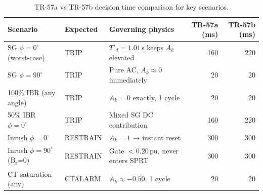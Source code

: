 \documentclass[11pt, a4paper]{article}
\newcommand{\Ak}{A_k}
\begin{document}
\begin{table}[htbp]
  \centering
  \caption{TR-57a vs TR-57b decision time comparison for key scenarios.}
  \label{tab:tr57ab_comparison}
  \begin{tabular}{lllrr}
    \toprule
    \textbf{Scenario} & \textbf{Expected} & \textbf{Governing physics}
      & \textbf{TR-57a (ms)} & \textbf{TR-57b (ms)} \\
    \midrule
    SG $\phi{=}0^\circ$ (worst-case) & TRIP
      & $T'_d=1.01\,$s keeps $\Ak$ elevated & 160 & 220 \\
    SG $\phi{=}90^\circ$             & TRIP
      & Pure AC, $A_k\approx 0$ immediately & 20  &  20 \\
    100\% IBR (any angle)             & TRIP
      & $A_k = 0$ exactly, 1 cycle           & 20  &  20 \\
    50\% IBR $\phi{=}0^\circ$        & TRIP
      & Mixed SG DC contribution             & 160 & 220 \\
    Inrush $\phi{=}0^\circ$          & RESTRAIN
      & $A_k=1$ → instant reset              & 300 & 300 \\
    Inrush $\phi{=}90^\circ$ (B\textsubscript{r}=0) & RESTRAIN
      & Gate $< 0.20\,$pu, never enters SPRT & 300 & 300 \\
    CT saturation (any)               & CTALARM
      & $A_k\approx{-0.50}$, 1 cycle          & 20  &  20 \\
    \bottomrule
  \end{tabular}
\end{table}
\end{document}
